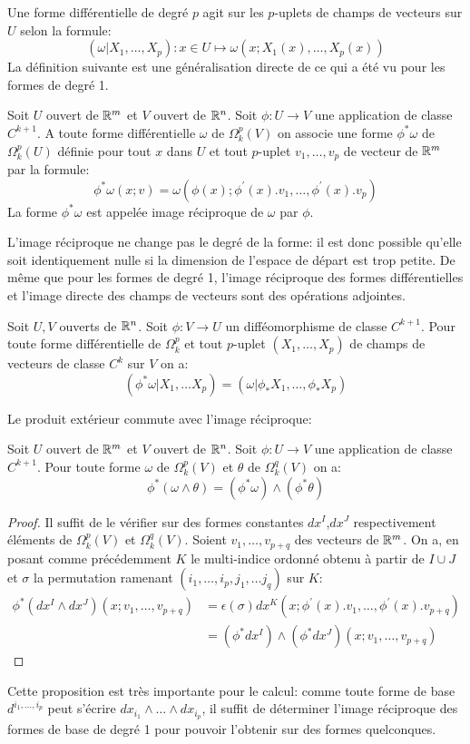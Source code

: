 Une forme différentielle de degré $p$ agit sur les $p$-uplets de champs de vecteurs sur $U$ selon la formule:
\[
\left(\omega|X_1,\dots,X_p\right) \colon x \in U \mapsto \omega\left(x;X_1(x),\dots,X_p(x)\right)
\]
La définition suivante est une généralisation directe de ce qui a été vu pour les formes de degré 1. 
\begin{fdefn}
Soit $U$ ouvert de $\mathbb{R}^m$ et $V$ ouvert de $\mathbb{R}^n$. Soit $\phi \colon U \to V$ une application de classe $C^{k+1}$. A toute forme différentielle $\omega$ de $\Omega_k^p(V)$ on associe une forme $\phi^*\omega$ de $\Omega_k^p(U)$ définie pour tout $x$ dans $U$ et tout $p$-uplet $v_1,\dots,v_p$ de vecteur de $\mathbb{R}^m$ par la formule:
\[
\phi^*\omega(x;v) = \omega(\phi(x);\phi^\prime(x).v_1,\dots,\phi^\prime(x).v_p)
\]
La forme $\phi^*\omega$ est appelée image réciproque de $\omega$ par $\phi$.
\end{fdefn}
L'image réciproque ne change pas le degré de la forme: il est donc possible qu'elle soit identiquement nulle si la dimension de l'espace de départ est trop petite. 
De même que pour les formes de degré 1, l'image réciproque des formes différentielles et l'image directe des champs de vecteurs sont des opérations adjointes. 
\begin{prop}
Soit $U,V$ ouverts de $\mathbb{R}^n$. Soit $\phi \colon V \to U$ un difféomorphisme de classe $C^{k+1}$. Pour toute forme différentielle de $\Omega_k^p$ et tout $p$-uplet $(X_1,\dots, X_p)$ de champs de vecteurs de classe $C^k$ sur $V$ on a:
\[
\left(\phi^* \omega | X_1,\dots X_p \right) = \left(\omega | \phi_* X_1,\dots,\phi_* X_p \right)
\]
\end{prop}
Le produit extérieur commute avec l'image réciproque:
\begin{fprop}
Soit $U$ ouvert de $\mathbb{R}^m$ et $V$ ouvert de $\mathbb{R}^n$. Soit $\phi \colon U \to V$ une application de classe $C^{k+1}$. Pour toute forme $\omega$ de $\Omega_k^p(V)$ et $\theta$ de $\Omega_k^q(V)$ on a:
\[
\phi^*(\omega \wedge \theta) = (\phi^*\omega)\wedge(\phi^*\theta)
\]
\end{fprop}
\begin{proof}
Il suffit de le vérifier sur des formes constantes $dx^I$,$dx^J$ respectivement éléments de $\Omega_k^p(V)$ et $\Omega_k^q(V)$. Soient $v_1,\dots,v_{p+q}$ des vecteurs de $\mathbb{R}^m$. On a, en posant comme précédemment $K$ le multi-indice ordonné obtenu à partir de $I\cup J$ et $\sigma$ la permutation ramenant $(i_1,\dots,i_p,j_1,\dots j_q)$ sur $K$:
\begin{align*}
\phi^*(dx^I \wedge dx^J)(x;v_1,\dots,v_{p+q}) & = \epsilon(\sigma) dx^K(x;\phi^\prime(x).v_1,\dots,\phi^\prime(x).v_{p+q}) \\
&  = (\phi^*dx^I)\wedge(\phi^*dx^J)(x;v_1,\dots,v_{p+q})
\end{align*}
\end{proof}
Cette proposition est très importante pour le calcul: comme toute forme de base $d^{i_1,\dots,i_p}$ peut s'écrire $dx_{i_1} \wedge \dots \wedge dx_{i_p}$, il suffit de déterminer l'image réciproque des formes de base de degré 1 pour pouvoir l'obtenir sur des formes quelconques. 


